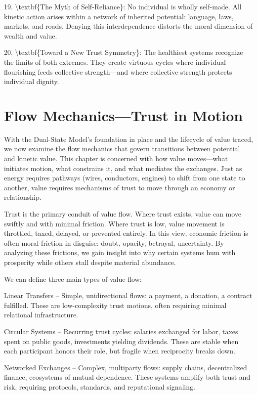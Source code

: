 \documentclass[11pt,oneside]{book}
\begin{document}
19. \textbackslash textbf\{The Myth of Self-Reliance\}: No individual is wholly self-made. All kinetic action arises within a network of inherited potential: language, laws, markets, and roads. Denying this interdependence distorts the moral dimension of wealth and value.

20. \textbackslash textbf\{Toward a New Trust Symmetry\}: The healthiest systems recognize the limits of both extremes. They create virtuous cycles where individual flourishing feeds collective strength—and where collective strength protects individual dignity.



\section{Flow Mechanics—Trust in Motion}

With the Dual-State Model’s foundation in place and the lifecycle of value traced, we now examine the flow mechanics that govern transitions between potential and kinetic value. This chapter is concerned with how value moves—what initiates motion, what constrains it, and what mediates the exchanges. Just as energy requires pathways (wires, conductors, engines) to shift from one state to another, value requires mechanisms of trust to move through an economy or relationship.

Trust is the primary conduit of value flow. Where trust exists, value can move swiftly and with minimal friction. Where trust is low, value movement is throttled, taxed, delayed, or prevented entirely. In this view, economic friction is often moral friction in disguise: doubt, opacity, betrayal, uncertainty. By analyzing these frictions, we gain insight into why certain systems hum with prosperity while others stall despite material abundance.

We can define three main types of value flow:

    Linear Transfers – Simple, unidirectional flows: a payment, a donation, a contract fulfilled. These are low-complexity trust motions, often requiring minimal relational infrastructure.

    Circular Systems – Recurring trust cycles: salaries exchanged for labor, taxes spent on public goods, investments yielding dividends. These are stable when each participant honors their role, but fragile when reciprocity breaks down.

    Networked Exchanges – Complex, multiparty flows: supply chains, decentralized finance, ecosystems of mutual dependence. These systems amplify both trust and risk, requiring protocols, standards, and reputational signaling.
\end{document}
